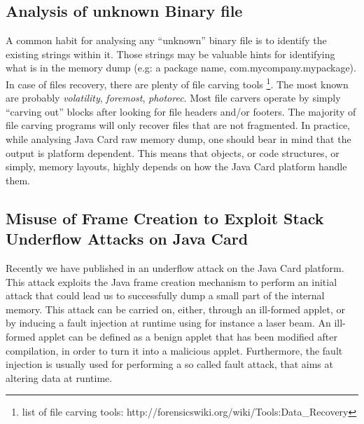 \subsection{Analysis of unknown Binary file}
A common habit for analysing any ``unknown'' binary file is to identify the existing strings within
it. Those strings may be valuable hints for identifying what is in the memory dump (e.g: a package
name, com.mycompany.mypackage). In case of files recovery, there are plenty of file carving tools
\footnote{list of file carving tools: http://forensicswiki.org/wiki/Tools:Data\_Recovery}. The most
known are probably \textit{volatility}, \textit{foremost}, \textit{photorec}.  Most file carvers
operate by simply ``carving out'' blocks after looking for file headers and/or footers. The majority
of file carving programs will only recover files that are not fragmented. In practice, while
analysing Java Card raw memory dump, one should bear in mind that the output is platform dependent.
This means that objects, or code structures, or simply, memory layouts, highly depends on how the
Java Card platform handle them. 

\subsection{Misuse of Frame Creation to Exploit Stack Underflow Attacks on Java Card} Recently we
have published in \cite{cardis15} an underflow attack on the Java Card platform. This attack
exploits the Java frame creation mechanism to perform an initial attack that could lead us to
successfully dump a small part of the internal memory. This attack can be carried on, either, through
an ill-formed applet, or by inducing a fault injection at runtime using for instance a laser beam.
An ill-formed applet can be defined as a benign applet that has been modified after compilation, in
order to turn it into a malicious applet. Furthermore, the fault injection is usually used for 
performing a so called fault attack, that aims at altering data at runtime.

